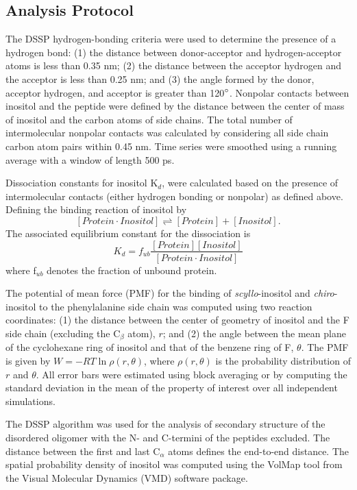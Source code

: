 \subsection{Analysis Protocol} %
\label{sub:analysis}

	The DSSP hydrogen-bonding criteria were used to determine the presence of a hydrogen bond: (1) the distance between donor-acceptor and hydrogen-acceptor atoms is less than 0.35 nm; (2) the distance between the acceptor hydrogen and the acceptor is less than 0.25 nm; and (3) the angle formed by the donor, acceptor hydrogen, and acceptor is greater than 120$^\circ$.\cite{Kabsch:1983p31} Nonpolar contacts between inositol and the peptide were defined by the distance between the center of mass of inositol and the carbon atoms of side chains. The total number of intermolecular nonpolar contacts was calculated by considering all side chain carbon atom pairs within 0.45 nm. Time series were smoothed using a running average with a window of length 500 ps.

	Dissociation constants for inositol K$_d$, were calculated based on the presence of intermolecular contacts (either hydrogen bonding or nonpolar) as defined above. Defining the binding reaction of inositol by
\[ \left[ Protein\cdot Inositol \right] \rightleftharpoons \left[ Protein \right] +\left[ Inositol \right]. \]
The associated equilibrium constant for the dissociation is
\[ K_{d} = f_{ub}\frac{\left[ Protein \right]\left[ Inositol \right]}{\left[Protein \cdot Inositol\right]} \]
where f$_{ub}$ denotes the fraction of unbound protein.	

The potential of mean force (PMF) for the binding of  \emph{scyllo}-inositol and  \emph{chiro}-inositol to the phenylalanine side chain was computed using two reaction coordinates: (1) the distance between the center of geometry of inositol and the F side chain (excluding the C$_{\beta}$ atom), $r$; and (2) the angle between the mean plane of the cyclohexane ring of inositol and that of the benzene ring of F, $\theta$. The PMF is given by $\mathit{W}=-RT\ln\rho\left(r,\theta\right)$, where $\rho\left(r,\theta\right)$ is the probability distribution of $r$ and $\theta$. All error bars were estimated using block averaging or by computing the standard deviation in the mean of the property of interest over all independent simulations.
  
The DSSP algorithm was used for the analysis of secondary structure of the disordered oligomer with the N- and C-termini of the peptides excluded. The distance between the first and last C$_{\alpha}$ atoms defines the end-to-end distance. The spatial probability density of inositol was computed using the VolMap tool from the Visual Molecular Dynamics (VMD) software package.\cite{Humphrey:1996p850}
